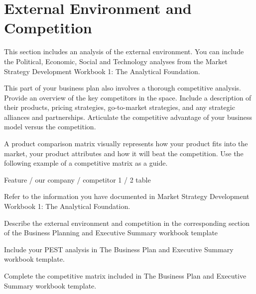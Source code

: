 \section{External Environment and Competition}

This section includes an analysis of the external environment. You can include the
Political, Economic, Social and Technology analyses from the Market Strategy
Development Workbook 1: The Analytical Foundation.

This part of your business plan also involves a thorough competitive analysis. Provide
an overview of the key competitors in the space. Include a description of their
products, pricing strategies, go-to-market strategies, and any strategic alliances and
partnerships. Articulate the competitive advantage of your business model versus the
competition.

A product comparison matrix visually represents how your product fits into the
market, your product attributes and how it will beat the competition. Use the
following example of a competitive matrix as a guide.

Feature / our company / competitor 1 / 2 table

Refer to the information you have documented in Market Strategy
Development Workbook 1: The Analytical Foundation.

Describe the external environment and competition in the
corresponding section of the Business Planning and Executive
Summary workbook template

Include your PEST analysis in The Business Plan and Executive
Summary workbook template.

Complete the competitive matrix included in The Business Plan and
Executive Summary workbook template.